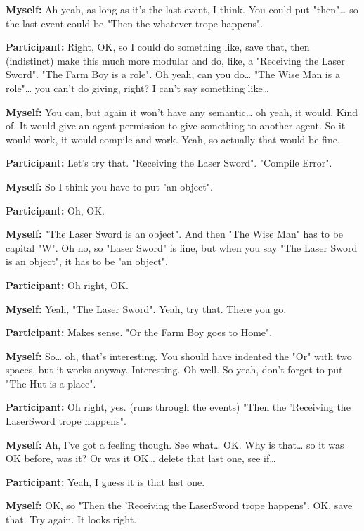 \documentclass[11pt]{report}
\newcommand{\llabel}[1]{\hypertarget{llineno:#1}{\linelabel{#1}}}
\begin{document}
\begin{linenumbers}
\textbf{Myself:} Ah yeah, as long as it's the last event, I think. You could put "then"\ldots{} so the last event could be "Then the whatever trope happens".

\textbf{Participant:} Right, OK, so I could do something like, save that, then
(indistinct) make this much more modular and do, like, a "Receiving the Laser
Sword". "The Farm Boy is a role". Oh yeah, can you do\ldots{} "The Wise Man is a
role"\ldots{} you can't do giving, right? I can't say something
like\ldots{}\llabel{lne:feature3d}

\textbf{Myself:} You can, but again it won't have any semantic\ldots{} oh yeah, it would. Kind of. It would give an agent permission to give something to another agent. So it would work, it would compile and work. Yeah, so actually that would be fine.\llabel{lne:feature4d2}

\textbf{Participant:} Let's try that. "Receiving the Laser Sword". "Compile Error".

\textbf{Myself:} So I think you have to put "an object".

\textbf{Participant:} Oh, OK.

\textbf{Myself:} "The Laser Sword is an object". And then "The Wise Man" has to be capital "W". Oh no, so "Laser Sword" is fine, but when you say "The Laser Sword is an object", it has to be "an object".

\textbf{Participant:} Oh right, OK. 

\textbf{Myself:} Yeah, "The Laser Sword". Yeah, try that. There you go.

\textbf{Participant:} Makes sense. "Or the Farm Boy goes to Home".

\textbf{Myself:} So\ldots{} oh, that's interesting. You should have indented the "Or" with two spaces, but it works anyway. Interesting. Oh well. So yeah, don't forget to put "The Hut is a place".

\textbf{Participant:} Oh right, yes. (runs through the events) "Then the 'Receiving the LaserSword trope happens".

\textbf{Myself:} Ah, I've got a feeling though. See what\ldots{} OK. Why is that\ldots{} so it was OK before, was it? Or was it OK\ldots{} delete that last one, see if\ldots{}

\textbf{Participant:} Yeah, I guess it is that last one.

\textbf{Myself:} OK, so "Then the 'Receiving the LaserSword trope happens". OK, save that. Try again. It looks right.


\end{linenumbers}
\end{document}
